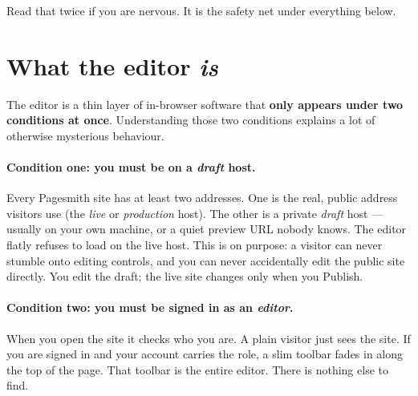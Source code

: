 \documentclass[11pt]{article}
\begin{document}

\noindent Read that twice if you are nervous. It is the safety net under everything
below.

\section{What the editor \emph{is}}

The editor is a thin layer of in-browser software that \textbf{only appears under two
conditions at once}. Understanding those two conditions explains a lot of otherwise
mysterious behaviour.

\paragraph{Condition one: you must be on a \emph{draft} host.} Every Pagesmith site
has at least two addresses. One is the real, public address visitors use (the
\emph{live} or \emph{production} host). The other is a private \emph{draft} host ---
usually  on your own machine, or a quiet preview URL nobody knows.
The editor flatly refuses to load on the live host. This is on purpose: a visitor can
never stumble onto editing controls, and you can never accidentally edit the public
site directly. You edit the draft; the live site changes only when you Publish.

\paragraph{Condition two: you must be signed in as an \emph{editor}.} When you open
the site it checks who you are. A plain visitor just sees the site. If you are signed
in and your account carries the  role, a slim toolbar fades in along the
top of the page. That toolbar is the entire editor. There is nothing else to find.
\end{document}
